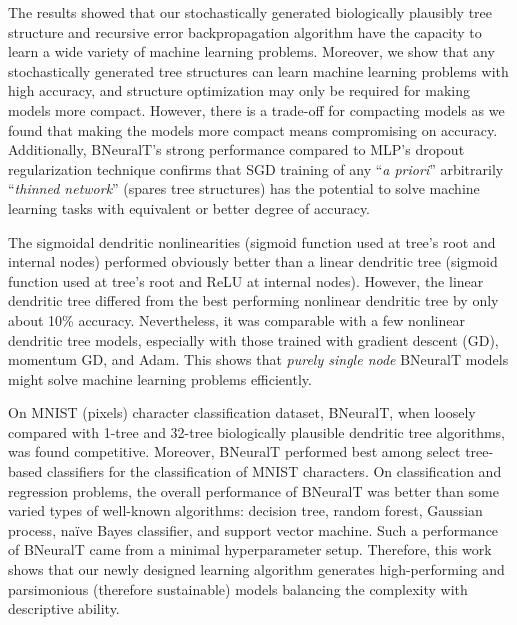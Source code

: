 \documentclass[11pt,a4paper]{article}
\begin{document}
    The results showed that our stochastically generated biologically plausibly tree structure and recursive error backpropagation algorithm have the capacity to learn a wide variety of machine learning problems. Moreover, we show that any stochastically generated tree structures can learn machine learning problems with high accuracy, and structure optimization may only be required for making models more compact. However, there is a trade-off for compacting models as we found that making the models more compact means compromising on accuracy. Additionally, BNeuralT's strong performance compared to MLP's dropout regularization technique confirms that SGD training of any ``\textit{a priori}'' arbitrarily ``\textit{thinned network}'' (spares tree structures) has the potential to solve machine learning tasks with equivalent or better degree of accuracy.

    The sigmoidal dendritic nonlinearities (sigmoid function used at tree’s root and internal nodes) performed obviously better than a linear dendritic tree (sigmoid function used at tree’s root and ReLU at internal nodes). However, the linear dendritic tree differed from the best performing nonlinear dendritic tree by only about 10\% accuracy. Nevertheless, it was comparable with a few nonlinear dendritic tree models, especially with those trained with gradient descent (GD), momentum GD, and Adam. This shows that \textit{purely single node} BNeuralT models might solve machine learning problems efficiently.
 
    On MNIST (pixels) character classification dataset, BNeuralT, when loosely compared with 1-tree and 32-tree biologically plausible dendritic tree algorithms, was found competitive. Moreover, BNeuralT performed best among select tree-based classifiers for the classification of MNIST characters. On classification and regression problems, the overall performance of BNeuralT was better than some varied types of well-known algorithms: decision tree, random forest, Gaussian process, naïve Bayes classifier, and support vector machine. Such a performance of BNeuralT came from a minimal hyperparameter setup. Therefore, this work shows that our newly designed learning algorithm generates high-performing and parsimonious (therefore sustainable) models balancing the complexity with descriptive ability.

    


    


    
    {\small
 

        
    }
    
\end{document}

